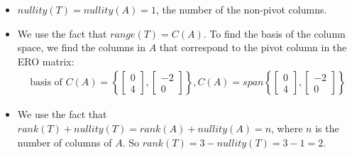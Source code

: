 \documentclass[a4paper,12pt]{article}
\begin{document}
\begin{itemize}
\begin{align*}
\begin{bmatrix}
    -\frac{11}{4}t\\
    \frac{3}{2}t\\
    t
    \end{bmatrix}: t \in \mathbb{R}\right\} =  \left\{t\begin{bmatrix}
    -\frac{11}{4}\\
    \frac{3}{2}\\
    1
    \end{bmatrix}: t \in \mathbb{R}\right\} = Span\left(\begin{bmatrix}
    -\frac{11}{4}\\
    \frac{3}{2}\\
    1
    \end{bmatrix}\right)
\end{align*}
    \item [b)] $nullity(T)=nullity(A)=1$, the number of the non-pivot columns.
    \item [c)] We use the fact that $range(T)=C(A)$. To find the basis of the column space, we find the columns in $A$ that correspond to the pivot column in the ERO matrix:
\begin{align*}
    \text{basis of }C(A)=
    \left\{
        \begin{bmatrix}
            0\\
            4
        \end{bmatrix}, \begin{bmatrix}
            -2\\
            0
        \end{bmatrix}
    \right\}, C(A)=span \left\{
        \begin{bmatrix}
            0\\
            4
        \end{bmatrix}, \begin{bmatrix}
            -2\\
            0
        \end{bmatrix}
    \right\}
\end{align*}
    \item [d)] We use the fact that $rank(T)+nullity(T)=rank(A)+nullity(A)=n$, where $n$ is the number of columns of $A$. So $rank(T)=3-nullity(T)=3-1=2.$
\end{itemize}
\end{document}
